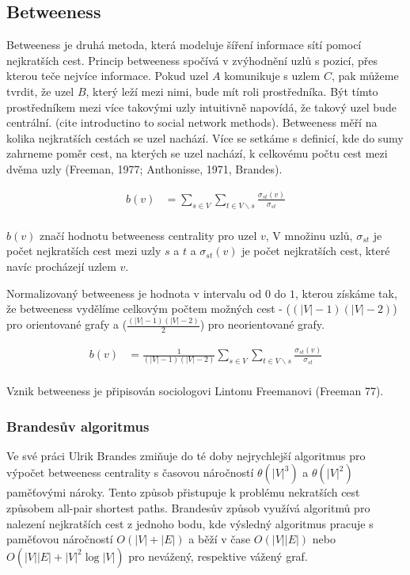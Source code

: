 \documentclass[12pt,titlepage]{report}
\begin{document}
\subsection{Betweeness}
Betweeness je druhá metoda, která modeluje šíření informace sítí pomocí
nejkratších cest. Princip betweeness spočívá v zvýhodnění uzlů s pozicí, přes
kterou teče nejvíce informace. Pokud uzel $A$ komunikuje s uzlem $C$, pak
můžeme tvrdit, že uzel $B$, který leží mezi nimi, bude mít roli prostředníka.
Být tímto prostředníkem mezi více takovými uzly intuitivně napovídá, že takový
uzel bude centrální.  (cite introductino to social network methods).
Betweeness měří na kolika nejkratších cestách se uzel nachází. Více se setkáme
s definicí, kde do sumy zahrneme poměr cest, na kterých se uzel nachází, k
celkovému počtu cest mezi dvěma uzly (Freeman, 1977; Anthonisse, 1971, Brandes).

\begin{align*}
b(v) &= \displaystyle\sum\limits_{s \in V} \displaystyle\sum\limits_{t \in V \backslash s} \frac{\sigma_{st}(v)}{\sigma_{st}} \\
\end{align*}

$b(v)$ značí hodnotu betweeness centrality pro uzel $v$, V množinu uzlů,
$\sigma_{st}$ je počet nejkratších cest mezi uzly $s$ a $t$ a $\sigma_{st}(v)$
je počet nejkratších cest, které navíc procházejí uzlem $v$.

Normalizovaný betweeness je hodnota v intervalu od $0$ do $1$, kterou získáme
tak, že betweeness vydělíme celkovým počtem možných cest - ($(|V| - 1)(|V| -
2)$) pro orientované grafy a ($\frac{(|V| - 1)(|V| - 2)}{2}$) pro neorientované
grafy.

\begin{align*}
b(v) &= \frac{1}{(|V| - 1)(|V| - 2)} \displaystyle\sum\limits_{s \in V} \displaystyle\sum\limits_{t \in V \backslash s} \frac{\sigma_{st}(v)}{\sigma_{st}} \\
\end{align*}

Vznik betweeness je připisován sociologovi Lintonu Freemanovi (Freeman 77).

\subsubsection{Brandesův algoritmus}
Ve své práci Ulrik Brandes zmiňuje do té doby nejrychlejší algoritmus pro
výpočet betweeness centrality s časovou náročností $\theta(|V|^3)$ a
$\theta(|V|^2)$ paměťovými nároky. Tento způsob přistupuje k problému
nekratších cest způsobem all-pair shortest paths. Brandesův způsob využívá
algoritmů pro nalezení nejkratších cest z jednoho bodu, kde výsledný algoritmus
pracuje s paměťovou náročností $O(|V| + |E|)$ a běží v čase $O(|V||E|)$ nebo
$O(|V||E| + |V|^2 \log|V|)$ pro nevážený, respektive vážený graf. 
\end{document}
